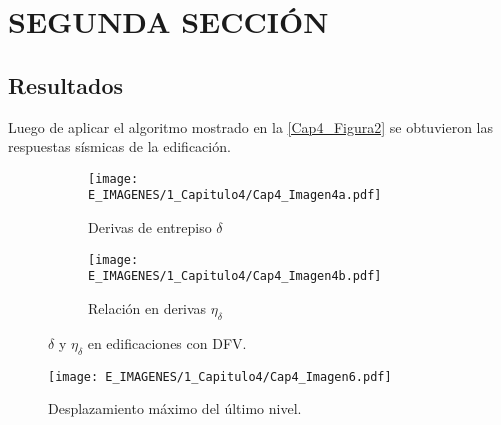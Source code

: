 \section{SEGUNDA SECCIÓN}

\subsection{Resultados} \label{subsection:Resul_DFV}

Luego de aplicar el algoritmo mostrado en la \autoref{Cap4_Figura2} se obtuvieron las respuestas sísmicas de la edificación.

\begin{figure}[!h]
	\centering
	\begin{subfigure}[b]{0.45\textwidth}
		\centering
		\texttt{[image: E\_IMAGENES/1\_Capitulo4/Cap4\_Imagen4a.pdf]}
		\caption{\raggedleft Derivas de entrepiso $\delta$ \hspace*{0.5cm}}
		\label{Cap4_Figura4a}
	\end{subfigure}
	\hspace{3mm}
	\begin{subfigure}[b]{0.45\textwidth}
		\centering
		\texttt{[image: E\_IMAGENES/1\_Capitulo4/Cap4\_Imagen4b.pdf]}
		\caption{\raggedleft Relación en derivas $\eta_{\delta}$ \hspace*{0.45cm}}
		\label{Cap4_Figura4b}
	\end{subfigure}
	\caption[$\delta$ y $\eta_{\delta}$ en edificaciones con DFV]{\centering\footnotesize $\delta$ y $\eta_{\delta}$ en edificaciones con DFV.}
	\label{Cap4_Figura4}
	\vspace{5 mm}
\end{figure}

\begin{figure}[!h]
	\centering
	\texttt{[image: E\_IMAGENES/1\_Capitulo4/Cap4\_Imagen6.pdf]}
	\vspace{-3 mm}
	\caption[Desplazamiento máximo del último nivel]{\centering\footnotesize Desplazamiento máximo del último nivel.}
	\label{Cap4_Figura5}
\end{figure}


